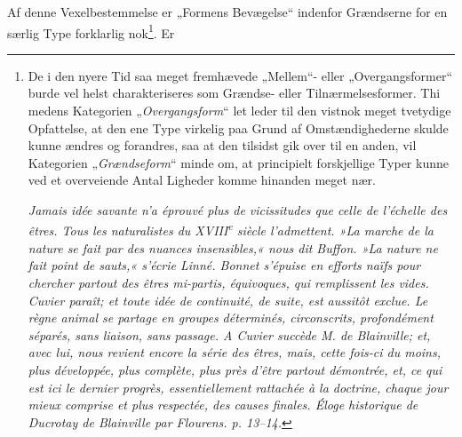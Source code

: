 \documentclass[12pt,a4paper]{book}
\begin{document}
\setcounter{footnote}{0}
Af denne Vexelbestemmelse er „Formens Bevægelse“ indenfor Grændserne for en
særlig Type forklarlig nok\footnote{De i den nyere Tid saa meget fremhævede
„Mellem“- eller „Overgangsformer“ burde vel helst charakteriseres som Grændse-
eller Tilnærmelsesformer. Thi medens Kategorien „\emph{Overgangsform}“ let leder
til den vistnok meget tvetydige Opfattelse, at den ene Type virkelig paa Grund
af Omstændighederne skulde kunne ændres og forandres, saa at den tilsidst gik
over til en anden, vil Kategorien „\emph{Grændseform}“ minde om, at principielt
forskjellige Typer kunne ved et overveiende Antal Ligheder komme hinanden meget
nær.
\par \textit{Jamais idée savante n'a éprouvé plus de vicissitudes que celle de
\emph{l'échelle des êtres}. Tous les naturalistes du XVIII\textsuperscript{e}
siècle l'admettent. »La marche de la nature se fait par des nuances
insensibles,« nous dit Buffon. »La nature ne fait point de sauts,« s'écrie
Linné. Bonnet s'épuise en efforts naïfs pour chercher partout des êtres
\emph{mi-partis, équivoques}, qui remplissent \emph{les vides}. Cuvier paraît;
et toute idée de continuité, de suite, est aussitôt exclue. Le règne animal se
partage en groupes déterminés, circonscrits, profondément séparés, sans liaison,
sans passage. A Cuvier succède M. de Blainville; et, avec lui, nous revient
encore \emph{la série des êtres}, mais, cette fois-ci du moins, plus
développée, plus complète, plus près d'être partout démontrée, et, ce qui est
ici le dernier progrès, essentiellement rattachée à la doctrine, chaque jour
mieux comprise et plus respectée, des \emph{causes finales}. Éloge historique
de Ducrotay de Blainville par Flourens. p. 13--14.}
}. Er
\end{document}
